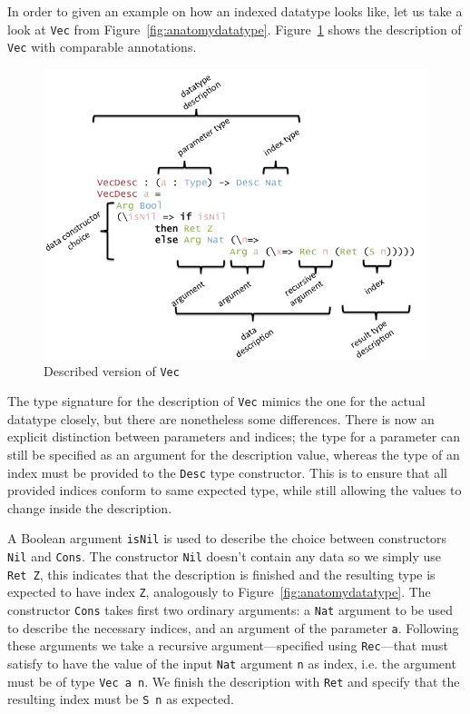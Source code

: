 \documentclass{ituthesis}
\newcommand{\ttconstructor}[1]{\textcolor{constructor-color}{\texttt{#1}}}
\newcommand{\tttype}[1]{\textcolor{type-color}{\texttt{#1}}}
\newcommand{\ttvar}[1]{\textcolor{local-var-color}{\texttt{#1}}}
\begin{document}
In order to given an example on how an indexed datatype looks like, let us take a look at \tttype{Vec} from Figure~\ref{fig:anatomydatatype}. Figure~\ref{fig:descvec} shows the description of \tttype{Vec} with comparable annotations.

\begin{figure}[ht]
\begin{center}
    \includegraphics[scale=0.5]{Figures/VectorDescription.png}
\end{center}
\caption{Described version of \tttype{Vec}}
\label{fig:descvec}
\end{figure}


The type signature for the description of \tttype{Vec} mimics the one for the actual datatype closely, but there are nonetheless some differences.
There is now an explicit distinction between parameters and indices; the type for a parameter can still be specified as an argument for the description value,
whereas the type of an index must be provided to the \tttype{Desc} type constructor.
This is to ensure that all provided indices conform to same expected type, while still allowing the values to change inside the description.

A Boolean argument \ttvar{isNil} is used to describe the choice between constructors \ttconstructor{Nil} and \ttconstructor{Cons}.
The constructor \ttconstructor{Nil} doesn't contain any data so we simply use \ttconstructor{Ret~Z}, this indicates that the description is finished and the resulting type is expected to have index \ttconstructor{Z}, analogously to Figure~\ref{fig:anatomydatatype}.
The constructor \ttconstructor{Cons} takes first two ordinary arguments: a \tttype{Nat} argument
to be used to describe the necessary indices, and an argument of the parameter \ttvar{a}. Following these arguments we take a recursive argument---specified using \ttconstructor{Rec}---that must satisfy to have the value of the input \tttype{Nat} argument \ttvar{n} as index, i.e. the argument must be of type \tttype{Vec}~\ttvar{a~n}. We finish the description with \ttconstructor{Ret} and specify that the resulting index must be \ttconstructor{S}~\ttvar{n} as expected.
\end{document}
